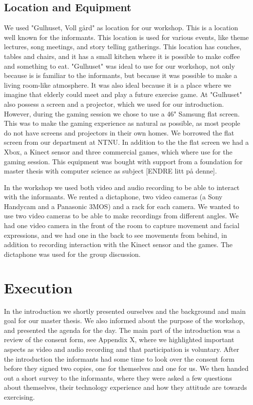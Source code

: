 \subsection{Location and Equipment}
We used "Gulhuset, Voll gård" as location for our workshop. This is a location well known for the informants. This location is used for various events, like theme lectures, song meetings, and story telling gatherings. This location has couches, tables and chairs, and it has a small kitchen where it is possible to make coffee and something to eat. "Gulhuset" was ideal to use for our workshop, not only because is is familiar to the informants, but because it was possible to make a living room-like atmosphere. It was also ideal because it is a place where we imagine that elderly could meet and play a future exercise game. At "Gulhuset" also possess a screen and a projector, which we used for our introduction. However, during the gaming session we chose to use a 46" Samsung flat screen. This was to make the gaming experience as natural as possible, as most people do not have screens and projectors in their own homes. We borrowed the flat screen from our department at NTNU. In addition to the the flat screen we had a Xbox, a Kinect sensor and three commercial games, which where use for the gaming session. This equipment was bought with support from a foundation for master thesis with computer science as subject [ENDRE litt på denne].   

In the workshop we used both video and audio recording to be able to interact with the informants. We rented a dictaphone, two video cameras (a Sony Handycam and a Panasonic 3MOS) and a rack for each camera. We wanted to use two video cameras to be able to make recordings from different angles. We had one video camera in the front of the room to capture movement and facial expressions, and we had one in the back to see movements from behind, in addition to recording interaction with the Kinect sensor and the games. The dictaphone was used for the group discussion.      

\section{Execution}
In the introduction we shortly presented ourselves and the background and main goal for our master thesis. We also informed about the purpose of the workshop, and presented the agenda for the day. The main part of the introduction was a review of the consent form, see Appendix X, where we highlighted important aspects as video and audio recording and that participation is voluntary. After the introduction the informants had some time to look over the consent form before they signed two copies, one for themselves and one for us. We then handed out a short survey to the informants, where they were asked a few questions about themselves, their technology experience and how they attitude are towards exercising. 

